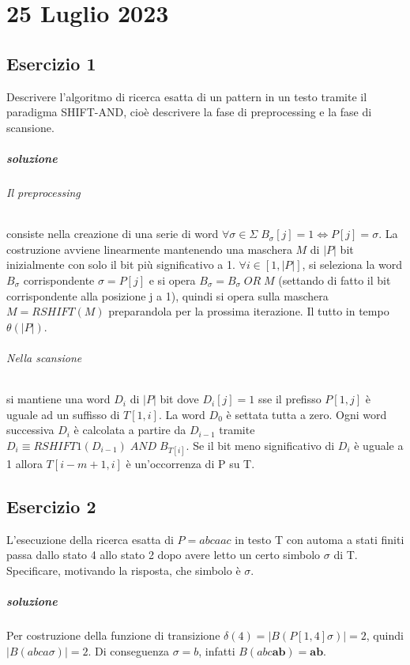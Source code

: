 \chapter{25 Luglio 2023}

\section{Esercizio 1}

Descrivere l'algoritmo di ricerca esatta di un pattern in un testo tramite il paradigma SHIFT-AND, cio\`e descrivere la fase di preprocessing e la fase di scansione.

\paragraph{soluzione}

\subparagraph{Il preprocessing} consiste nella creazione di una serie di word $\forall \sigma \in \Sigma \; B_\sigma[j] = 1 \Leftrightarrow P[j] = \sigma$. La costruzione avviene linearmente mantenendo una maschera $M$ di $|P|$ bit inizialmente con solo il bit pi\`u significativo a 1. $\forall i \in [1,|P|]$, si seleziona la word $B_\sigma$ corrispondente $\sigma = P[j]$ e si opera $B_\sigma = B_\sigma \; OR \; M$ (settando di fatto il bit corrispondente alla posizione j a 1), quindi si opera sulla maschera $M = RSHIFT(M)$ preparandola per la prossima iterazione. Il tutto in tempo $\theta(|P|)$.

\subparagraph{Nella scansione} si mantiene una word $D_i$ di $|P|$ bit dove $D_i[j] = 1$ sse il prefisso $P[1,j]$ \`e uguale ad un suffisso di $T[1,i]$. La word $D_0$ \`e settata tutta a zero. Ogni word successiva $D_{i}$ \`e calcolata a partire da $D_{i-1}$ tramite $D_{i} \equiv RSHIFT1(D_{i-1}) \; AND \; B_{T[i]}$. Se il bit meno significativo di $D_i$ \`e uguale a 1 allora $T[i-m+1,i]$ \`e un'occorrenza di P su T.

\section{Esercizio 2}

L'esecuzione della ricerca esatta di $P = abcaac$ in testo T con automa a stati finiti passa dallo stato 4 allo stato 2 dopo avere letto un certo simbolo $\sigma$ di T.
Specificare, motivando la risposta, che simbolo \`e $\sigma$.

\paragraph{soluzione} Per costruzione della funzione di transizione $\delta(4) = |B(P[1,4]\sigma)| = 2$, quindi $|B(abca\sigma)| = 2$. Di conseguenza $\sigma = b$, infatti $B(abc\textbf{ab}) = \textbf{ab}$.

